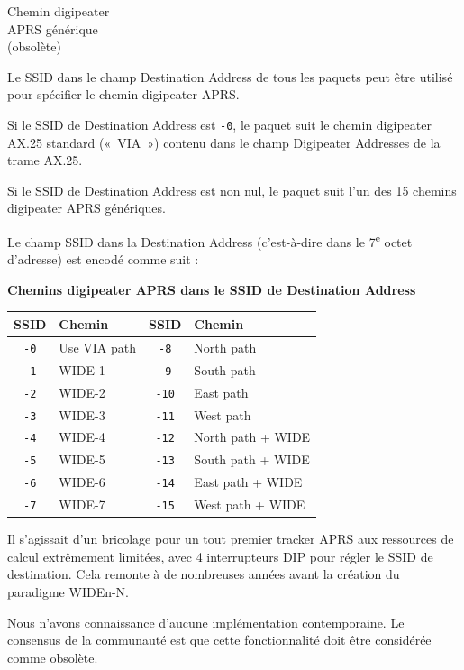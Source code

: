\begin{aprssideblock}{Chemin digipeater\\APRS générique\\(obsolète)}
\label{chemin-digipeater-aprs-guxe9nuxe9rique}
Le SSID dans le champ Destination Address de tous les paquets peut être
utilisé pour spécifier le chemin digipeater APRS.

Si le SSID de Destination Address est \texttt{-0}, le paquet suit le
chemin digipeater AX.25 standard («~VIA~») contenu dans le champ
Digipeater Addresses de la trame AX.25.

Si le SSID de Destination Address est non nul, le paquet suit l'un des
15 chemins digipeater APRS génériques.

Le champ SSID dans la Destination Address (c'est-à-dire dans le
7\textsuperscript{e} octet d'adresse) est encodé comme suit :

{\sffamily\bfseries Chemins digipeater APRS dans le SSID de Destination Address}

\begin{center}
{\small
\setlength{\arrayrulewidth}{0.75pt}
\setlength{\tabcolsep}{4pt}
\renewcommand{\arraystretch}{1.2}
\begin{tabular}{|c|l|c|l|}
\hline
\rowcolor{gray!20}
\bfseries SSID & \bfseries Chemin & \bfseries SSID & \bfseries Chemin \\
\hline
\texttt{-0}  & Use VIA path   & \texttt{-8}  & North path \\
\hline
\texttt{-1}  & WIDE-1         & \texttt{-9}  & South path \\
\hline
\texttt{-2}  & WIDE-2         & \texttt{-10} & East path \\
\hline
\texttt{-3}  & WIDE-3         & \texttt{-11} & West path \\
\hline
\texttt{-4}  & WIDE-4         & \texttt{-12} & North path + WIDE \\
\hline
\texttt{-5}  & WIDE-5         & \texttt{-13} & South path + WIDE \\
\hline
\texttt{-6}  & WIDE-6         & \texttt{-14} & East path + WIDE \\
\hline
\texttt{-7}  & WIDE-7         & \texttt{-15} & West path + WIDE \\
\hline
\end{tabular}
}
\end{center}

Il s'agissait d'un bricolage pour un tout premier tracker APRS aux
ressources de calcul extrêmement limitées, avec 4 interrupteurs DIP pour
régler le SSID de destination. Cela remonte à de nombreuses années avant
la création du paradigme WIDEn-N.

Nous n'avons connaissance d'aucune implémentation contemporaine. Le
consensus de la communauté est que cette fonctionnalité doit être
considérée comme obsolète.
\end{aprssideblock}

